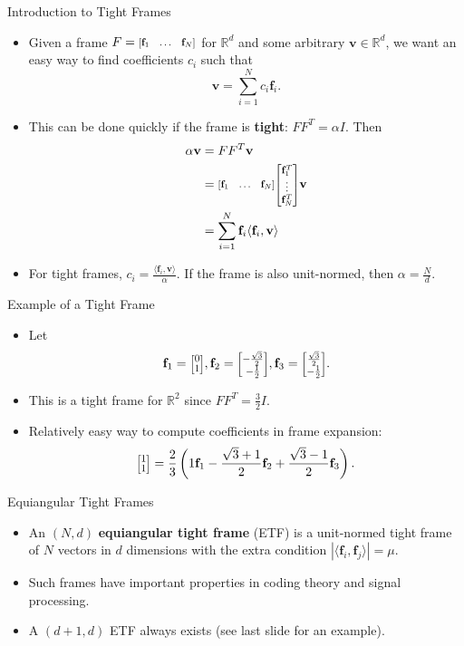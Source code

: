 \documentclass{beamer}
\newcommand{\RR}{\mathbb{R}}
\renewcommand{\vec}[1]{\mathbf{#1}}
\newcommand{\ivec}[2][.8]{%
  \scalebox{#1}{%
    \renewcommand{\arraystretch}{.8}%
    $\begin{bmatrix}#2\end{bmatrix}$%
  }
}
\begin{document}
{
\usebackgroundtemplate{}
\begin{frame}{Introduction to Tight Frames}
  \begin{itemize}
    \item <1-> Given a frame $F = \ivec{\vec{f}_1 & \ldots & \vec{f}_N}$ for $\RR^d$ and some arbitrary $\vec{v}\in\RR^d$, we want an easy way to find coefficients $c_i$ such that
    \[
        \vec{v} = \sum_{i=1}^{N}c_i\vec{f}_i.
    \]
    \item <2-> This can be done quickly if the frame is \textbf{tight}: $FF^{T} = \alpha I$.
    Then
    \begin{align*}
        \alpha\vec{v}
        &= FF^{T}\vec{v} \\
        &= \ivec{\vec{f}_1 & \ldots & \vec{f}_N}\ivec{\vec{f}_1^T \\ \vdots \\ \vec{f}_N^T}\vec{v} \\
        &= \sum_{i=1}^{N}\vec{f}_i\langle\vec{f}_i,\vec{v}\rangle
    \end{align*}
    \item <3-> For tight frames, $c_i = \frac{\langle\vec{f}_i,\vec{v}\rangle}{\alpha}$.
    If the frame is also unit-normed, then $\alpha = \frac{N}{d}$.
  \end{itemize}
\end{frame}
}
\begin{frame}{Example of a Tight Frame}
  \begin{itemize}
    \item <1-> Let 
    \[
        \vec{f}_{1} = \ivec{0\\1},\vec{f}_{2} = \ivec{-\frac{\sqrt{3}}{2} \\ -\frac{1}{2}}, \vec{f}_{3} = \ivec{\frac{\sqrt{3}}{2} \\ -\frac{1}{2}}.
    \]

    \item <2-> This is a tight frame for $\RR^2$ since $FF^{T} = \frac{3}{2}I$.

    \item <3-> Relatively easy way to compute coefficients in frame expansion:
    \[
        \ivec{1 \\ 1} = \frac{2}{3}\left(1\vec{f}_1 -\frac{\sqrt{3}+1}{2}\vec{f}_2 + \frac{\sqrt{3}-1}{2}\vec{f}_3\right).
    \]
  \end{itemize}
\end{frame}

\begin{frame}{Equiangular Tight Frames}
  \begin{itemize}
    \item <1-> An $(N,d)$ \textbf{equiangular tight frame} (ETF) is a unit-normed tight frame of $N$ vectors  in $d$ dimensions with the extra condition $|\langle\vec{f}_i,\vec{f}_j\rangle| = \mu$.
    \item <2-> Such frames have important properties in coding theory and signal processing.\cite{SH1}
    \item <3-> A $(d+1,d)$ ETF always exists (see last slide for an example).
    \cite{datta2016construction}
  \end{itemize}
\end{frame}
\end{document}
